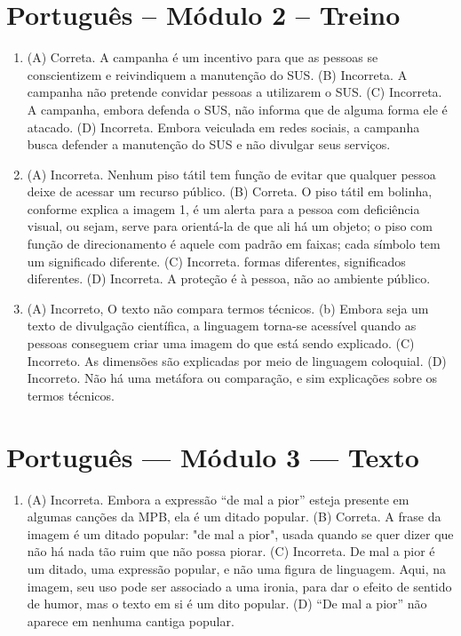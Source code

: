 \section*{Português – Módulo 2 – Treino}

\begin{enumerate}
\item (A) Correta. A campanha é um incentivo para que as pessoas se
conscientizem e reivindiquem a manutenção do SUS.
(B) Incorreta. A campanha não pretende convidar pessoas a utilizarem o
SUS.
(C) Incorreta. A campanha, embora defenda o SUS, não informa que de
alguma forma ele é atacado.
(D) Incorreta. Embora veiculada em redes sociais, a campanha busca
defender a manutenção do SUS e não divulgar seus serviços.

\item (A) Incorreta. Nenhum piso tátil tem função de evitar que qualquer pessoa
deixe de acessar um recurso público.
(B) Correta. O piso tátil em bolinha, conforme explica a imagem 1, é um
alerta para a pessoa com deficiência visual, ou sejam, serve para
orientá-la de que ali há um objeto; o piso com função de direcionamento
é aquele com padrão em faixas; cada símbolo tem um significado
diferente.
(C) Incorreta. formas diferentes, significados diferentes.
(D) Incorreta. A proteção é à pessoa, não ao ambiente público.

\item (A) Incorreto, O texto não compara termos técnicos.
(b) Embora seja um texto de divulgação científica, a linguagem torna-se
acessível quando as pessoas conseguem criar uma imagem do que está sendo
explicado.
(C) Incorreto. As dimensões são explicadas por meio de linguagem
coloquial.
(D) Incorreto. Não há uma metáfora ou comparação, e sim explicações sobre
os termos técnicos.
\end{enumerate}

\section*{Português — Módulo 3 — Texto}

\begin{enumerate}
\item (A) Incorreta. Embora a expressão ``de mal a pior'' esteja presente em
algumas canções da MPB, ela é um ditado popular.
(B) Correta. A frase da imagem é um ditado popular: "de mal a pior",
usada quando se quer dizer que não há nada tão ruim que não possa
piorar.
(C) Incorreta. De mal a pior é um ditado, uma expressão popular, e não
uma figura de linguagem. Aqui, na imagem, seu uso pode ser associado a
uma ironia, para dar o efeito de sentido de humor, mas o texto em si é
um dito popular.
(D) ``De mal a pior'' não aparece em nenhuma cantiga popular.
\end{enumerate}

